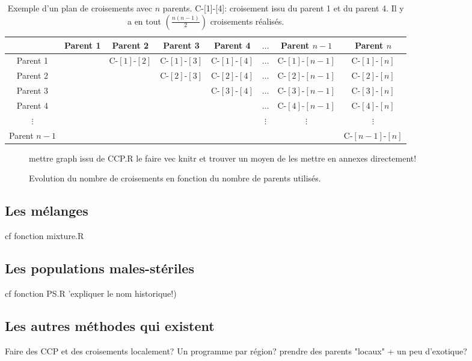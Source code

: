 \begin{table}[H]
\begin{tabular}{c|ccccccc}
\hline
& Parent 1 & Parent 2 & Parent 3 & Parent 4 & $\ldots$ & Parent $n-1$ & Parent $n$ \\
\hline
Parent 1 &  & C-$[1]$-$[2]$ & C-$[1]$-$[3]$ & C-$[1]$-$[4]$ & $\ldots$ & C-$[1]$-$[n-1]$ & C-$[1]$-$[n]$\\
Parent 2 &  &  & C-$[2]$-$[3]$ & C-$[2]$-$[4]$ & $\ldots$ & C-$[2]$-$[n-1]$ & C-$[2]$-$[n]$\\
Parent 3 &  &  &  & C-$[3]$-$[4]$ & $\ldots$ & C-$[3]$-$[n-1]$ & C-$[3]$-$[n]$\\
Parent 4 &  &  &  & & $\ldots$ & C-$[4]$-$[n-1]$ & C-$[4]$-$[n]$\\
$\vdots$ & & & & & $\vdots$ & $\vdots$ & $\vdots$ \\
Parent $n-1$ &  &  &  &  &  &  & C-$[n-1]$-$[n]$\\
\hline
\end{tabular}
\caption{Exemple d'un plan de croisements avec $n$ parents. 
C-[1]-[4]: croisement issu du parent 1 et du parent 4.
Il y a en tout $(\frac{n(n-1)}{2})$ croisements réalisés.}
\label{mutli-cross}
\end{table}


\begin{figure}
mettre graph issu de CCP.R
le faire vec knitr et trouver un moyen de les mettre en annexes directement!
\caption{Evolution du nombre de croisements en fonction du nombre de parents utilisés.}
\end{figure}

\subsection{Les mélanges}

cf fonction mixture.R


\subsection{Les populations males-stériles}

cf fonction PS.R 'expliquer le nom historique!)

\subsection{Les autres méthodes qui existent}

Faire des CCP et des croisements localement? Un programme par région?
prendre des parents "locaux" + un peu d'exotique?

